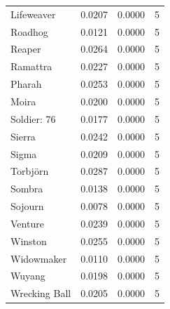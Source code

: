 \begin{tabular}{lrrr}
Lifeweaver & 0.0207 & 0.0000 & 5 \\
Roadhog & 0.0121 & 0.0000 & 5 \\
Reaper & 0.0264 & 0.0000 & 5 \\
Ramattra & 0.0227 & 0.0000 & 5 \\
Pharah & 0.0253 & 0.0000 & 5 \\
Moira & 0.0200 & 0.0000 & 5 \\
Soldier: 76 & 0.0177 & 0.0000 & 5 \\
Sierra & 0.0242 & 0.0000 & 5 \\
Sigma & 0.0209 & 0.0000 & 5 \\
Torbjörn & 0.0287 & 0.0000 & 5 \\
Sombra & 0.0138 & 0.0000 & 5 \\
Sojourn & 0.0078 & 0.0000 & 5 \\
Venture & 0.0239 & 0.0000 & 5 \\
Winston & 0.0255 & 0.0000 & 5 \\
Widowmaker & 0.0110 & 0.0000 & 5 \\
Wuyang & 0.0198 & 0.0000 & 5 \\
Wrecking Ball & 0.0205 & 0.0000 & 5 \\
\bottomrule
\end{tabular}
